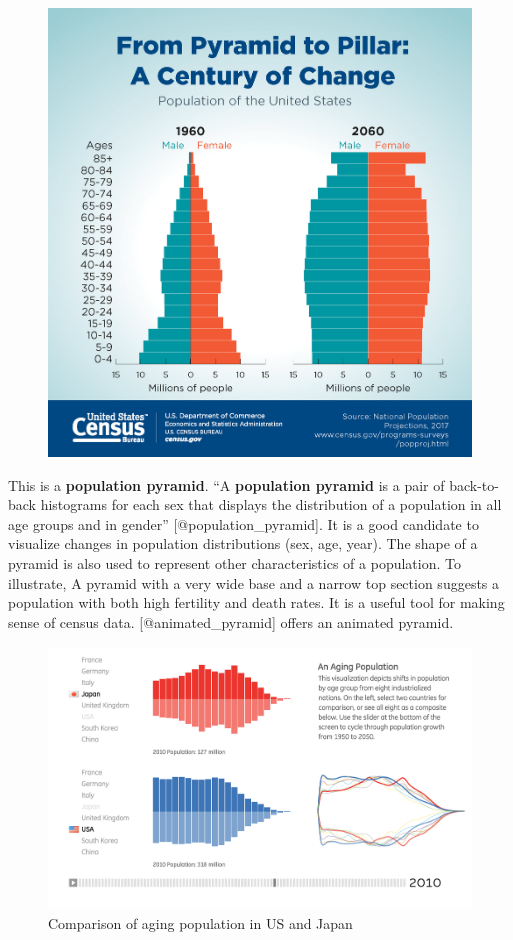 \documentclass[]{book}
\theoremstyle{definition}
\theoremstyle{definition}
\theoremstyle{definition}
\theoremstyle{remark}
\begin{document}
\begin{figure}
\centering
\includegraphics{images/Pyramid.jpg}
\caption{}
\end{figure}

This is a \textbf{population pyramid}. ``A \textbf{population pyramid}
is a pair of back-to-back histograms for each sex that displays the
distribution of a population in all age groups and in gender''
{[}@population\_pyramid{]}. It is a good candidate to visualize changes
in population distributions (sex, age, year). The shape of a pyramid is
also used to represent other characteristics of a population. To
illustrate, A pyramid with a very wide base and a narrow top section
suggests a population with both high fertility and death rates. It is a
useful tool for making sense of census data. {[}@animated\_pyramid{]}
offers an animated pyramid.

\begin{figure}
\centering
\includegraphics{images/3_1.png}
\caption{Comparison of aging population in US and Japan}
\end{figure}
\end{document}
